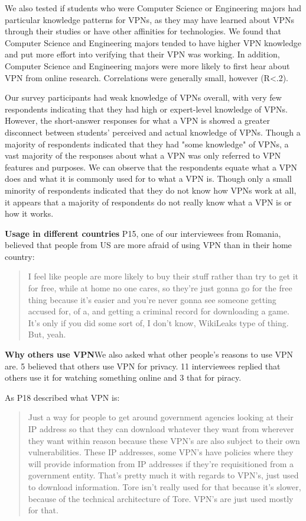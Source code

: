 We also tested if students who were Computer Science or Engineering majors had
particular knowledge patterns for VPNs, as they may have learned about VPNs
through their studies or have other affinities for technologies. We found that
Computer Science and Engineering majors tended to have higher VPN knowledge
and put more effort into verifying that their VPN was working. In addition,
Computer Science and Engineering majors were more likely to first hear about
VPN from online research. Correlations were generally small, however (R<.2).

Our survey participants had weak knowledge of VPNs overall, with very few
respondents indicating that they had high or expert-level knowledge of VPNs.
However, the short-answer responses for what a VPN is showed a greater
disconnect between students’ perceived and actual knowledge of VPNs. Though a
majority of respondents indicated that they had "some knowledge" of VPNs, a
vast majority of the responses about what a VPN was only referred to VPN
features and purposes. We can observe that the respondents equate what a VPN
does and what it is commonly used for to what a VPN is. Though only a small
minority of respondents indicated that they do not know how VPNs work at all,
it appears that a majority of respondents do not really know what a VPN is or
how it works.

\textbf{Usage in different countries}
P15, one of our interviewees from Romania, believed that people from US are
more afraid of using VPN than in their home country: \begin{quote}I feel like
people are more likely to buy their stuff rather than try to get it for free,
while at home no one cares, so they're just gonna go for the free thing
because it's easier and you're never gonna see someone getting accused for, of
a, and getting a criminal record for downloading a game. It's only if you did
some sort of, I don't know, WikiLeaks type of thing. But, yeah.\end{quote}


\textbf{Why others use VPN}We also asked what other people's reasons to use
VPN are. 5 believed that others use VPN for privacy. 11 interviewees replied
that others use it for watching something online and 3 that for piracy.

As P18 described what VPN is: \begin{quote} Just a way for people to get
around government agencies looking at their IP address so that they can
download whatever they want from wherever they want within reason because
these VPN's are also subject to their own vulnerabilities. These IP addresses,
some VPN's have policies where they will provide information from IP addresses
if they're requisitioned from a government entity. That's pretty much it with
regards to VPN's, just used to download information. Tore isn't really used
for that because it's slower, because of the technical architecture of Tore.
VPN's are just used mostly for that.\end{quote}

